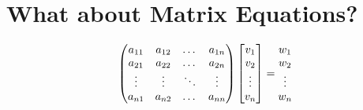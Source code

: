 \documentclass{article}
\begin{document}
\section{What about Matrix Equations?}
\begin{equation*}                                           %
\begin{pmatrix}                                             %
a_{11}&a_{12}&\dots&a_{1n}\\                                %
a_{21}&a_{22}&\dots&a_{2n}\\
\vdots&\vdots&\ddots&\vdots\\                               %
a_{n1}&a_{n2}&\dots&a_{nn}
\end{pmatrix}                                               %
\begin{bmatrix}                                             %
v_{1}\\                                                     %
v_{2}\\
\vdots\\
v_{n}
\end{bmatrix}                                               %
=
\begin{matrix}                                              %
w_{1}\\                                                     %
w_{2}\\
\vdots\\
w_{n}
\end{matrix}                                                %
\vspace{+15mm}
\end{equation*}                                             %
\end{document}
